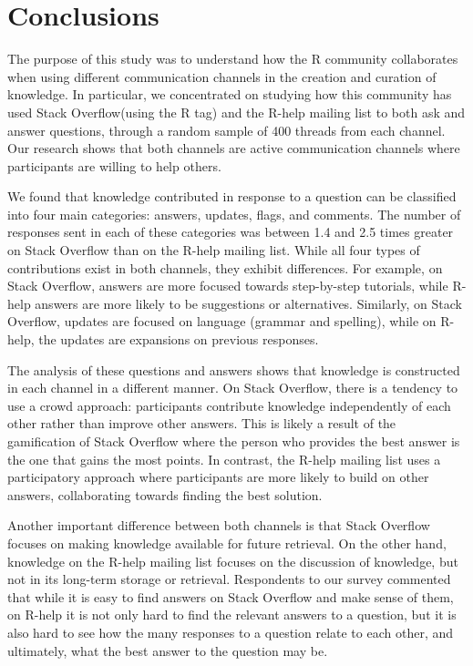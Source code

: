 \documentclass[smallextended]{svjour3}       %
\newcommand{\SO}{Stack Overflow\xspace}
\newcommand{\RH}{R-help\xspace}
\begin{document}
 \section{Conclusions}
\label{cha:conclusion}

The purpose of this study was to understand how the R community collaborates when using different communication channels in the creation and curation of knowledge.
In particular, we concentrated on studying how this community has used \SO (using the R tag) and the \RH mailing list to both ask and answer questions, through a random sample of 400 threads from each channel. Our research shows that both channels are active communication channels where participants are willing to help others. 

We found that knowledge contributed in response to a question can be classified into four main categories: answers, updates, flags, and comments. The number of
responses sent in each of these categories was between 1.4 and 2.5 times greater on \SO than on the \RH mailing list. While all four types of contributions exist in both
channels, they exhibit differences. For example, on \SO, answers are more focused towards step-by-step tutorials, while \RH answers are more
likely to be suggestions or alternatives. Similarly, on \SO, updates are focused on language (grammar and spelling), while on \RH, the updates are
expansions on previous responses.

The analysis of these questions and answers shows that knowledge is constructed in each channel in a different manner. On \SO, there is a tendency to use
a crowd approach: participants contribute knowledge independently of each other rather than improve other answers. This is likely a result of the
gamification of \SO where the person who provides the best answer is the one that gains the most points.
In contrast, the \RH mailing list uses a participatory approach where participants are more likely to build on other answers, collaborating towards finding the best solution.

Another important difference between both channels is that \SO focuses on making knowledge available for future retrieval. On the other hand, knowledge on the \RH mailing list 
focuses on the discussion of knowledge, but not in its long-term storage or retrieval. Respondents to our survey commented that while it is easy to find answers on \SO
and make sense of them, on \RH it is not only hard to find the relevant answers to a question, but it is also hard to see how the many responses to a question
relate to each other, and ultimately, what the best answer to the question may be.
\end{document}
